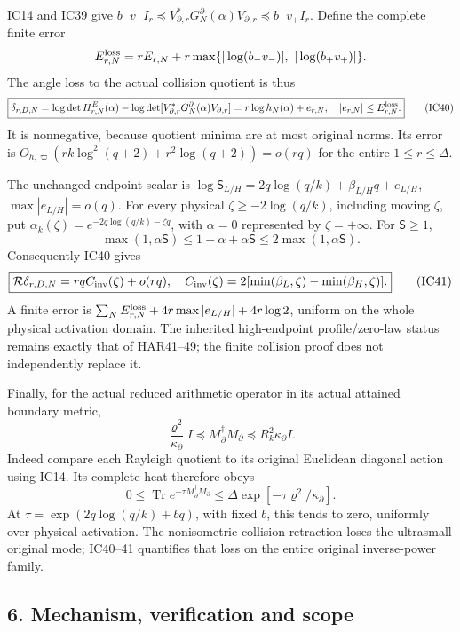\documentclass[11pt]{article}
\begin{document}
IC14 and IC39 give \(b_-v_-I_r\preceq V_{\partial,r}^*G_N^\partial(\alpha)V_{\partial,r}\preceq b_+v_+I_r\). Define the complete finite error \[
E_{r,N}^{\rm loss}
=rE_{r,N}+r\max\{|\log(b_-v_-)|,\ |\log(b_+v_+)|\}.
\] The angle loss to the actual collision quotient is thus \[
\boxed{\delta_{r,D,N}=
\log\det H^E_{r,N}(\alpha)
-\log\det[V_{\partial,r}^*G_N^\partial(\alpha)V_{\partial,r}]
=r\log h_N(\alpha)+e_{r,N},\quad |e_{r,N}|\le E_{r,N}^{\rm loss}.}
\tag{IC40}
\] It is nonnegative, because quotient minima are at most original norms. Its error is \(O_{h,\varpi}(rk\log^2(q+2)+r^2\log(q+2))=o(rq)\) for the entire \(1\le r\le\Delta\).

The unchanged endpoint scalar is \(\log\mathsf S_{L/H}=2q\log(q/k)+\beta_{L/H}q+e_{L/H}\), \(\max|e_{L/H}|=o(q)\). For every physical \(\zeta\ge-2\log(q/k)\), including moving \(\zeta\), put \(\alpha_k(\zeta)=e^{-2q\log(q/k)-\zeta q}\), with \(\alpha=0\) represented by \(\zeta=+\infty\). For \(\mathsf S\ge1\), \[
\max(1,\alpha\mathsf S)\le1-\alpha+\alpha\mathsf S
\le2\max(1,\alpha\mathsf S).
\] Consequently IC40 gives \[
\boxed{\mathcal R\delta_{r,D,N}
=rqC_{\rm inv}(\zeta)+o(rq),\quad
C_{\rm inv}(\zeta)=
2[\min(\beta_L,\zeta)-\min(\beta_H,\zeta)].}
\tag{IC41}
\] A finite error is \(\sum_NE_{r,N}^{\rm loss}+4r\max|e_{L/H}|+4r\log2\), uniform on the whole physical activation domain. The inherited high-endpoint profile/zero-law status remains exactly that of HAR41--49; the finite collision proof does not independently replace it.

Finally, for the actual reduced arithmetic operator in its actual attained boundary metric, \[
\frac{\varrho^2}{\kappa_\partial}I
\preceq M_\partial^\dagger M_\partial
\preceq R_k^2\kappa_\partial I.
\tag{IC42}
\] Indeed compare each Rayleigh quotient to its original Euclidean diagonal action using IC14. Its complete heat therefore obeys \[
0\le\operatorname{Tr}e^{-\tau M_\partial^\dagger M_\partial}
\le\Delta\exp[-\tau\varrho^2/\kappa_\partial].
\] At \(\tau=\exp(2q\log(q/k)+bq)\), with fixed \(b\), this tends to zero, uniformly over physical activation. The nonisometric collision retraction loses the ultrasmall original mode; IC40--41 quantifies that loss on the entire original inverse-power family.

\subsection{6. Mechanism, verification and scope}\label{mechanism-verification-and-scope}
\end{document}
